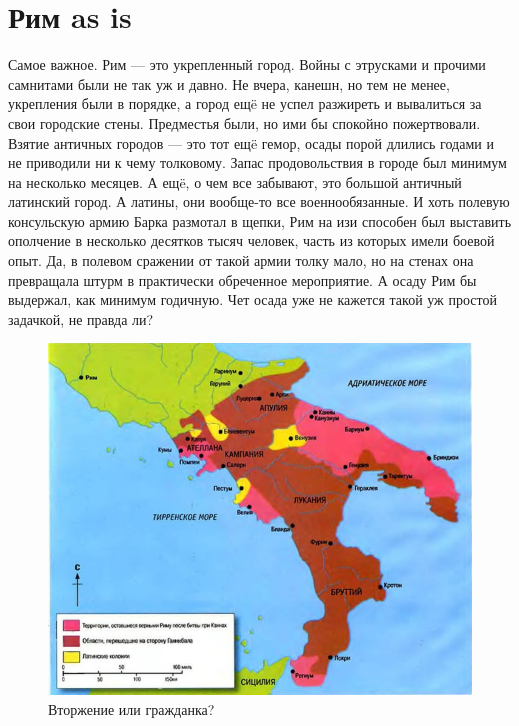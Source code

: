 \section{Рим as is}
Самое важное. Рим — это укрепленный город. Войны с этрусками и прочими самнитами были не так уж и давно. Не вчера, канешн, но тем не менее, укрепления были в порядке, а город ещë не успел разжиреть и вывалиться за свои городские стены. Предместья были, но ими бы спокойно пожертвовали. Взятие античных городов — это тот ещë гемор, осады порой длились годами и не приводили ни к чему толковому. Запас продовольствия в городе был минимум на несколько месяцев. А ещë, о чем все забывают, это большой античный латинский город. А латины, они вообще-то все военнообязанные. И хоть полевую консульскую армию Барка размотал в щепки, Рим на изи способен был выставить ополчение в несколько десятков тысяч человек, часть из которых имели боевой опыт. Да, в полевом сражении от такой армии толку мало, но на стенах она превращала штурм в практически обреченное мероприятие. А осаду Рим бы выдержал, как минимум годичную. Чет осада уже не кажется такой уж простой задачкой, не правда ли?

\begin{figure}[h!tb]
	\centering\includegraphics[scale=0.4]{Data/Hannibal_and_Rome/1622873076128424117.png}
	\caption{Вторжение или гражданка?}
	\label{fig:barka2} %
\end{figure}

